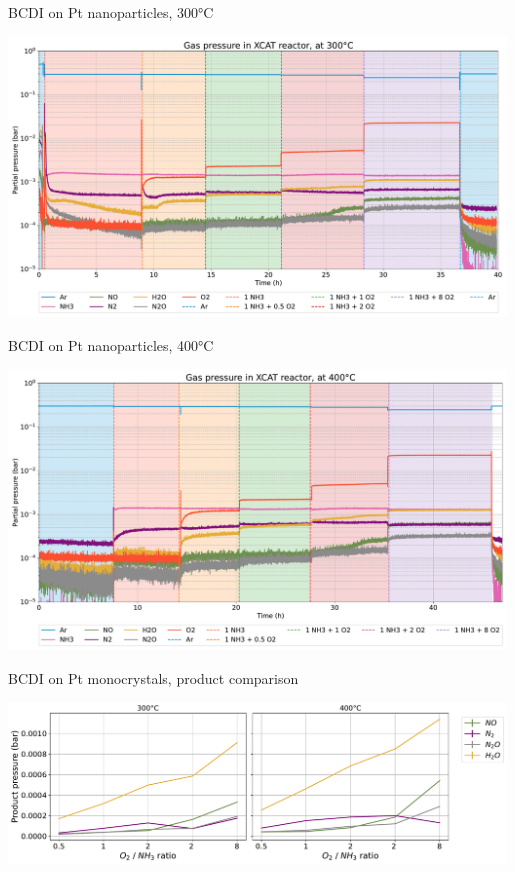 \begin{frame}{BCDI on Pt nanoparticles, 300°C}

	\includegraphics[width=0.99\textwidth]{Figures/gas_analysis/BCDI/rga_300_norm_carrier.pdf}

\end{frame}

\begin{frame}{BCDI on Pt nanoparticles, 400°C}

	\includegraphics[width=0.99\textwidth]{Figures/gas_analysis/BCDI/rga_400_norm_carrier.pdf}

\end{frame}

\begin{frame}{BCDI on Pt monocrystals, product comparison}

	\includegraphics[width=0.99\textwidth]{Figures/gas_analysis/BCDI/product_comparison.pdf}

\end{frame}